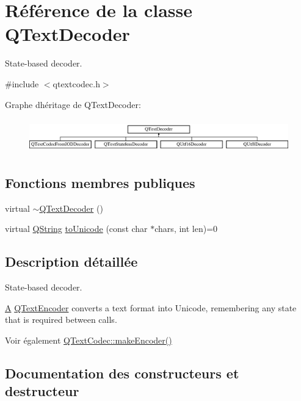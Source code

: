 \hypertarget{class_q_text_decoder}{}\section{Référence de la classe Q\+Text\+Decoder}
\label{class_q_text_decoder}


State-\/based decoder.  




{\ttfamily \#include $<$qtextcodec.\+h$>$}

Graphe d\textquotesingle{}héritage de Q\+Text\+Decoder\+:\begin{figure}[H]
\begin{center}
\leavevmode
\includegraphics[height=1.473684cm]{class_q_text_decoder}
\end{center}
\end{figure}
\subsection*{Fonctions membres publiques}
\begin{DoxyCompactItemize}
\item 
virtual \hyperlink{class_q_text_decoder_ad5772ca1143d9a4f460b5848fb764581}{$\sim$\+Q\+Text\+Decoder} ()
\item 
virtual \hyperlink{class_q_string}{Q\+String} \hyperlink{class_q_text_decoder_aec543f7f6670dfda14164268e2da879d}{to\+Unicode} (const char $\ast$chars, int len)=0
\end{DoxyCompactItemize}


\subsection{Description détaillée}
State-\/based decoder. 

\hyperlink{class_a}{A} \hyperlink{class_q_text_encoder}{Q\+Text\+Encoder} converts a text format into Unicode, remembering any state that is required between calls.

\begin{DoxySeeAlso}{Voir également}
\hyperlink{class_q_text_codec_a27628237031589bbaf95d3f4b4e7d7db}{Q\+Text\+Codec\+::make\+Encoder()} 
\end{DoxySeeAlso}


\subsection{Documentation des constructeurs et destructeur}
\hypertarget{class_q_text_decoder_ad5772ca1143d9a4f460b5848fb764581}{}

